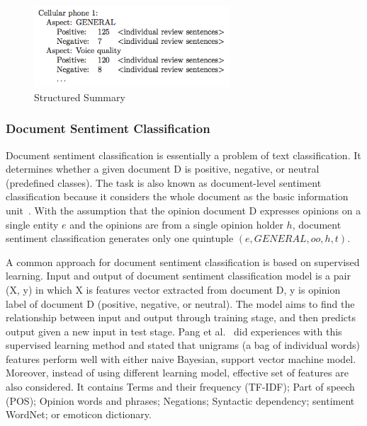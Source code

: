 \documentclass{article}
\begin{document}
\begin{figure}[ht]
\centering
\includegraphics[width=0.65\textwidth]{AbOS}
\caption{Structured Summary}
\label{fir:abos}
\end{figure}

\subsubsection{Document Sentiment Classification}

Document sentiment classification is essentially a problem of text classification.
It determines whether a given document D is positive, negative, or neutral (predefined classes).
The task is also known as document-level sentiment classification because it considers the whole document as the basic information unit~\cite{Liu2012}.
With the assumption that the opinion document D expresses opinions on a single entity $e$ and the opinions are from a single opinion holder $h$, document sentiment classification generates only one quintuple $(e,GENERAL,oo,h,t)$. 

A common approach for document sentiment classification is based on supervised learning.
Input and output of document sentiment classification model is a pair (X, y) in which X is features vector extracted from document D, y is opinion label of document D (positive, negative, or neutral).
The model aims to find the relationship between input and output through training stage, and then predicts output given a new input in test stage.
Pang et al.~\cite{Pang:2002:TUS:1118693.1118704} did experiences with this supervised learning method and stated that unigrams (a bag of individual words) features perform well with either naive Bayesian, support vector machine model.
Moreover, instead of using different learning model, effective set of features are also considered. It contains Terms and their frequency (TF-IDF); Part of speech (POS); Opinion words and phrases; Negations; Syntactic dependency; sentiment WordNet; or emoticon dictionary.
\end{document}

